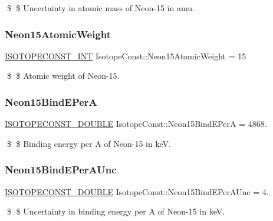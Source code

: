\$ \$ Uncertainty in atomic mass of Neon-\/15 in amu. \mbox{\label{group___isotope_const-_neon-_ne15_ga56bd3674cddc38da86d5099f26ece0e9}} 
\subsubsection{\texorpdfstring{Neon15\+Atomic\+Weight}{Neon15AtomicWeight}}
{\footnotesize\ttfamily \mbox{\hyperlink{group___isotope_const-_macros_ga5f18360b3e99483a35c32d789e62621c}{I\+S\+O\+T\+O\+P\+E\+C\+O\+N\+S\+T\+\_\+\+I\+NT}} Isotope\+Const\+::\+Neon15\+Atomic\+Weight = 15}

\$ \$ Atomic weight of Neon-\/15. \mbox{\label{group___isotope_const-_neon-_ne15_ga3b35890dd20394ea7b284864b7a23eec}} 
\subsubsection{\texorpdfstring{Neon15\+Bind\+E\+PerA}{Neon15BindEPerA}}
{\footnotesize\ttfamily \mbox{\hyperlink{group___isotope_const-_macros_ga8f45a7272ce02c0b4c65c44636ed719a}{I\+S\+O\+T\+O\+P\+E\+C\+O\+N\+S\+T\+\_\+\+D\+O\+U\+B\+LE}} Isotope\+Const\+::\+Neon15\+Bind\+E\+PerA = 4868.}

\$ \$ Binding energy per A of Neon-\/15 in keV. \mbox{\label{group___isotope_const-_neon-_ne15_ga49f8bdd779045a0cc1beff3660d6e192}} 
\subsubsection{\texorpdfstring{Neon15\+Bind\+E\+Per\+A\+Unc}{Neon15BindEPerAUnc}}
{\footnotesize\ttfamily \mbox{\hyperlink{group___isotope_const-_macros_ga8f45a7272ce02c0b4c65c44636ed719a}{I\+S\+O\+T\+O\+P\+E\+C\+O\+N\+S\+T\+\_\+\+D\+O\+U\+B\+LE}} Isotope\+Const\+::\+Neon15\+Bind\+E\+Per\+A\+Unc = 4.}

\$ \$ Uncertainty in binding energy per A of Neon-\/15 in keV. \mbox{\label{group___isotope_const-_neon-_ne15_ga00c83078c420db04c40faa3ed772bc17}} 
